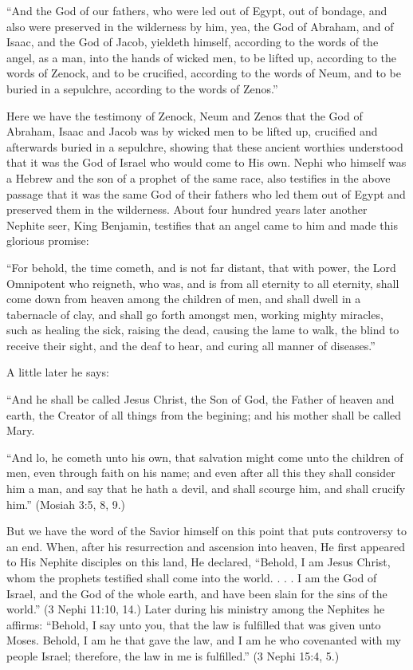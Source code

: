 ``And the God of our fathers, who were led out of Egypt, out of bondage, and also were
preserved in the wilderness by him, yea, the God of Abraham, and of Isaac, and the God of
Jacob, yieldeth himself, according to the words of the angel, as a man, into the hands of
wicked men, to be lifted up, according to the words of Zenock, and to be crucified, according
to the words of Neum, and to be buried in a sepulchre, according to the words of Zenos.''

Here we have the testimony of Zenock, Neum and Zenos that the God of Abraham, Isaac and
Jacob was by wicked men to be lifted up, crucified and afterwards buried in a sepulchre,
showing that these ancient worthies understood that it was the God of Israel who would come
to His own. Nephi who himself was a Hebrew and the son of a prophet of the same race, also
testifies in the above passage that it was the same God of their fathers who led them out of
Egypt and preserved them in the wilderness. About four hundred years later another Nephite
seer, King Benjamin, testifies that an angel came to him and made this glorious promise:

``For behold, the time cometh, and is not far distant, that with power, the Lord Omnipotent
who reigneth, who was, and is from all eternity to all eternity, shall come down from heaven
among the children of men, and shall dwell in a tabernacle of clay, and shall go forth
amongst men, working mighty miracles, such as healing the sick, raising the dead, causing
the lame to walk, the blind to receive their sight, and the deaf to hear, and curing all manner
of diseases.''

A little later he says:

``And he shall be called Jesus Christ, the Son of God, the Father of heaven and earth, the
Creator of all things from the begining; and his mother shall be called Mary.

``And lo, he cometh unto his own, that salvation might come unto the children of men, even
through faith on his name; and even after all this they shall consider him a man, and say that
he hath a devil, and shall scourge him, and shall crucify him.'' (Mosiah 3:5, 8, 9.)

But we have the word of the Savior himself on this point that puts controversy to an end.
When, after his resurrection and ascension into heaven, He first appeared to His Nephite
disciples on this land, He declared, ``Behold, I am Jesus Christ, whom the prophets testified
shall come into the world. . . . I am the God of Israel, and the God of the whole earth, and
have been slain for the sins of the world.'' (3 Nephi 11:10, 14.) Later during his ministry
among the Nephites he affirms: ``Behold, I say unto you, that the law is fulfilled that was
given unto Moses. Behold, I am he that gave the law, and I am he who covenanted with my
people Israel; therefore, the law in me is fulfilled.'' (3 Nephi 15:4, 5.)

